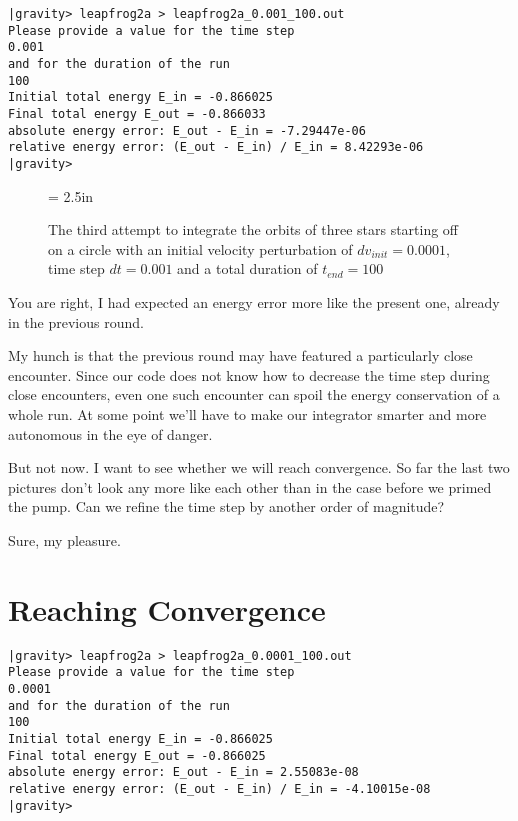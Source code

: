 \begin{small}
\begin{verbatim}
|gravity> leapfrog2a > leapfrog2a_0.001_100.out
Please provide a value for the time step
0.001
and for the duration of the run
100
Initial total energy E_in = -0.866025
Final total energy E_out = -0.866033
absolute energy error: E_out - E_in = -7.29447e-06
relative energy error: (E_out - E_in) / E_in = 8.42293e-06
|gravity>
\end{verbatim}
\end{small}

\begin{figure}[htb]
\begin{center}
\epsfxsize = 2.5in
\caption[Three stars on a circle, leapfrog, $dv_{init}=0.0001$, $dt = 0.001$,
$t_{end} = 100$]
{The third attempt to integrate the orbits of three stars
starting off on a circle with an initial velocity perturbation of 
$dv_{init}=0.0001$, time step $dt = 0.001$ and a total duration of
$t_{end} = 100$}
\label{fig:leap2a-0.001-100}
\end{center}
\end{figure}

\abc

\bob
You are right, I had expected an energy error more like the present
one, already in the previous round.

\alice
My hunch is that the previous round may have featured a particularly
close encounter.  Since our code does not know how to decrease the
time step during close encounters, even one such encounter can spoil
the energy conservation of a whole run.  At some point we'll have to
make our integrator smarter and more autonomous in the eye of danger.

\carol
But not now.  I want to see whether we will reach convergence.  So far
the last two pictures don't look any more like each other than in the
case before we primed the pump.  Can we refine the time step by
another order of magnitude?

\alice
Sure, my pleasure.

\cba

\section{Reaching Convergence}

\begin{small}
\begin{verbatim}
|gravity> leapfrog2a > leapfrog2a_0.0001_100.out
Please provide a value for the time step
0.0001
and for the duration of the run
100
Initial total energy E_in = -0.866025
Final total energy E_out = -0.866025
absolute energy error: E_out - E_in = 2.55083e-08
relative energy error: (E_out - E_in) / E_in = -4.10015e-08
|gravity>
\end{verbatim}
\end{small}

